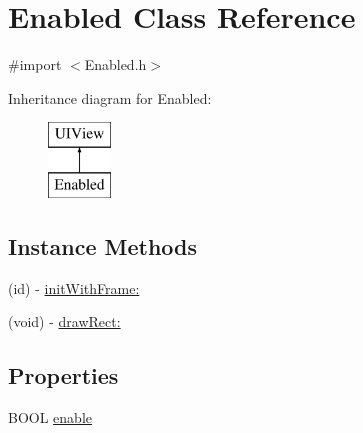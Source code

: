 \hypertarget{interface_enabled}{\section{Enabled Class Reference}
\label{interface_enabled}
}


{\ttfamily \#import $<$Enabled.\-h$>$}

Inheritance diagram for Enabled\-:\begin{figure}[H]
\begin{center}
\leavevmode
\includegraphics[height=2.000000cm]{interface_enabled}
\end{center}
\end{figure}
\subsection*{Instance Methods}
\begin{DoxyCompactItemize}
\item 
(id) -\/ \hyperlink{interface_enabled_aea448cd26f5ff98802c71ddd0e0779d4}{init\-With\-Frame\-:}
\item 
(void) -\/ \hyperlink{interface_enabled_adca7720fd6d29f0204a55ed5d2ac60b6}{draw\-Rect\-:}
\end{DoxyCompactItemize}
\subsection*{Properties}
\begin{DoxyCompactItemize}
\item 
B\-O\-O\-L \hyperlink{interface_enabled_af41c21cfdba152b8c3f664127a36888a}{enable}
\end{DoxyCompactItemize}


